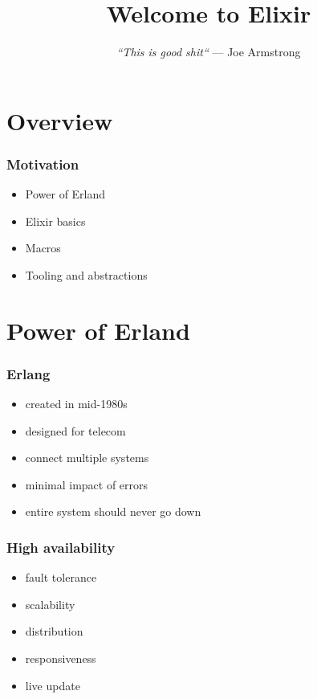 \documentclass{beamer}
\begin{document}
\title{Welcome to Elixir}
\subtitle{
  \textit{
    \linebreak
    ``This is good shit``
    \linebreak
  }
  \tiny{\textrm{--- Joe Armstrong}}
}
\frame{\titlepage}


\section[Section]{Overview}

\begin{frame}
  \frametitle{Motivation}
  \begin{itemize}
  \item Power of Erland
  \item Elixir basics
  \item Macros
  \item Tooling and abstractions
  \end{itemize}
\end{frame}

\section[Section]{Power of Erland}

\begin{frame}
  \frametitle{Erlang}
  \begin{itemize}
  \item created in mid-1980s
  \item designed for telecom
  \item connect multiple systems
  \item minimal impact of errors
  \item entire system should never go down
  \end{itemize}
\end{frame}

\begin{frame}
  \frametitle{High availability}
  \begin{itemize}
  \item fault tolerance
  \item scalability
  \item distribution
  \item responsiveness
  \item live update
  \end{itemize}
\end{frame}
\end{document}
